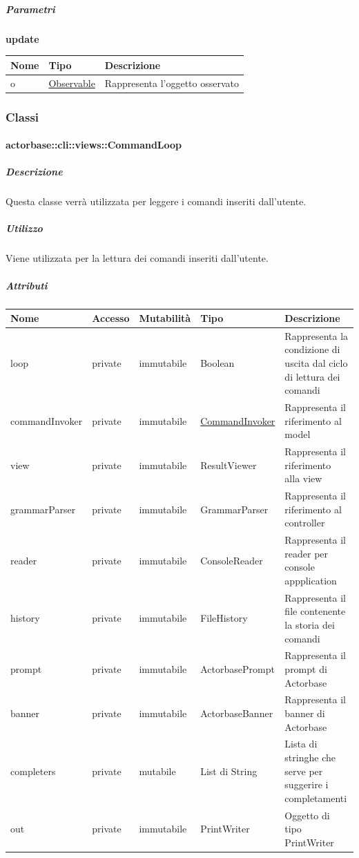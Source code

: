 \documentclass{scalatekids-article}
\begin{document}
\subparagraph{Parametri}
\begin{center}
  \textbf{update}
\end{center}
\begin{tabular}{| p{3cm} | p{3.5cm} | p{8.5cm} |}
  \hline
  Nome & Tipo & Descrizione\\
  \hline
  o & \hyperref[actorbase::cli::models::Observable]{Observable} & Rappresenta l'oggetto osservato\\
  \hline
\end{tabular}

\subsubsection{Classi}

\paragraph{actorbase::cli::views::CommandLoop}
\label{sec:actorbase::cli::views::CommandLoop}

\subparagraph{Descrizione}
Questa classe verrà utilizzata per leggere i comandi inseriti dall'utente.

\subparagraph{Utilizzo}
Viene utilizzata per la lettura dei comandi inseriti dall'utente.

\subparagraph{Attributi}
\begin{tabular}{| p{2.5cm} | p{1.5cm} | p{2cm} | p{2.5cm} | p{8.5cm} |}
  \hline
  Nome & Accesso & Mutabilità & Tipo & Descrizione\\
  \hline
  loop & private & immutabile & Boolean & Rappresenta la condizione di uscita dal ciclo di lettura dei comandi\\
  \hline
  commandInvoker & private & immutabile & \hyperref[sec:actorbase::cli::models::CommandInvoker]{CommandInvoker} & Rappresenta il riferimento al model\\
  \hline
  view & private & immutabile & ResultViewer & Rappresenta il riferimento alla view\\
  \hline
  grammarParser & private & immutabile & GrammarParser & Rappresenta il riferimento al controller\\
  \hline
  reader & private & immutabile & ConsoleReader & Rappresenta il reader per console appplication \\
  \hline
  history & private & immutabile & FileHistory & Rappresenta il file contenente la storia dei comandi\\
  \hline
  prompt & private & immutabile & ActorbasePrompt & Rappresenta il prompt di Actorbase\\
  \hline
  banner & private & immutabile & ActorbaseBanner & Rappresenta il banner di Actorbase\\
  \hline
  completers & private & mutabile & List di String & Lista di stringhe che serve per suggerire i completamenti\\
  \hline
  out & private & immutabile & PrintWriter & Oggetto di tipo PrintWriter\\
  \hline
\end{tabular}
\end{document}
